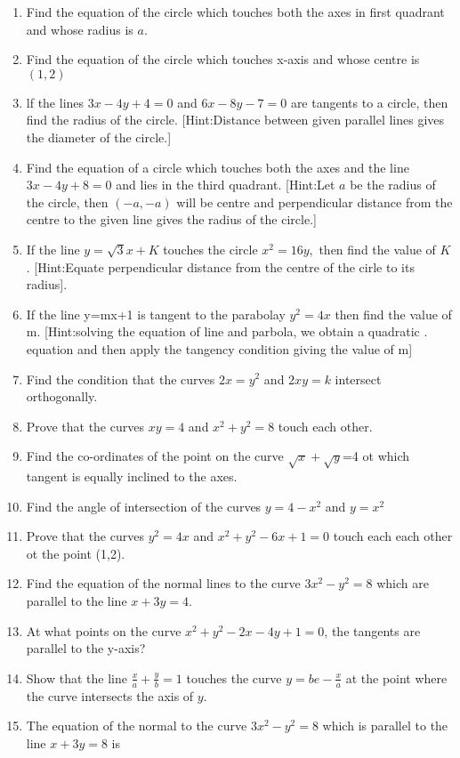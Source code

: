 \begin{enumerate}[label=\thesection.\arabic*,ref=\thesection.\theenumi]
 \item Find the equation of the circle which touches both the axes in first quadrant and whose radius is $a$.
 \item Find the equation of the circle which touches x-axis and whose centre is $(1,2)$
 \item lf the lines $3x-4y+4=0$ and $6x-8y-7=0$ are tangents to a circle, then find the radius of the circle.
 [Hint:Distance between given parallel lines gives the diameter of the circle.]
 \item Find the equation of a circle which touches  both the axes and the line $3x-4y+8=0$ and lies in the third quadrant.
 [Hint:Let $a$ be the radius of the circle, then $(-a,-a)$ will be centre and perpendicular distance from the centre to the given line gives the radius of the circle.]
 \item If the line $y=\sqrt{3}x+K$ touches the circle $x^2=16y,$ then find the value of $K$.
 [Hint:Equate perpendicular distance from the centre of the cirle to its radius].
\item If the line y=mx+1 is tangent to the parabolay $y^2=4x$ then find the value of m.
[Hint:solving the equation of line  and parbola, we obtain a quadratic . equation and then apply the tangency condition giving the value of m]
\item Find the condition that the curves $2x=y^2$ and $2xy=k$ intersect orthogonally.
\item Prove that the curves $xy=4$ and $x^2+y^2=8$ touch each other.
\item Find the co-ordinates of the point on the curve $\sqrt{x}+\sqrt{y}$=4 ot which tangent is equally inclined to the axes.
\item Find the angle of intersection of the curves $y=4-x^2$ and $y=x^2$
\item Prove that the curves $y^2=4x$ and $x^2+y^2-6x+1=0$ touch each each other ot the point (1,2).
\item Find the equation of the normal lines to the curve $3x^2-y^2=8$ which are parallel to the line $x+3y=4$.
\item At what points on the curve $x^2+y^2-2x-4y+1=0$, the tangents are parallel to the y-axis?
\item Show that the line $\frac{x}{a}+\frac{y}{b}=1$ touches the curve $y=be-\frac{x}{a}$ at the point where the curve intersects the axis of $y$.
 \item The equation of the normal to the curve $3x^2-y^2 =8$ which is parallel to the line $x+3y=8$ is

\end{enumerate}
